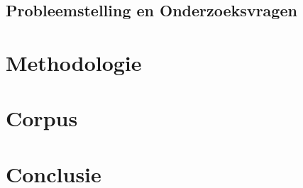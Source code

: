 \documentclass[pdftex,a4paper,12pt,twoside]{report}
\begin{document}
\section{Probleemstelling en Onderzoeksvragen}
\label{sec:onderzoeksvragen}


\chapter{Methodologie}
\label{ch:methodologie}



\chapter{Corpus}
\label{ch:corpus}


\chapter{Conclusie}
\label{ch:conclusie}








\listoffigures
\listoftables
\end{document}
